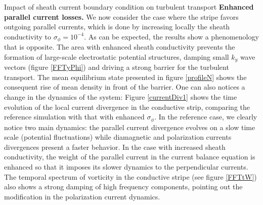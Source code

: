 \documentclass[a4paper,12pt]{article} %
\begin{document}
\begin{section}{Impact of sheath current boundary condition on turbulent transport}
\textbf{Enhanced parallel current losses.} We now consider the case where the stripe favors outgoing parallel 
currents, which is done by increasing locally the sheath conductivity to $\sigma_\phi=10^{-4}$. As can be expected, 
the results show a phenomenology that is opposite.
The area with enhanced sheath conductivity prevents the formation of large-scale electrostatic potential 
structures, damping small $k_y$ wave vectors (figure \ref{FFTyPhi}) and driving a strong barrier for the turbulent 
transport. The mean equilibrium state presented in figure \ref{profileN} shows the consequent rise of mean density 
in front of the barrier. 
One can also notices a change in the dynamics of the system: Figure \ref{currentDiv1}
shows the time evolution of the local current divergence in the conductive strip, comparing the reference simulation 
with that with enhanced $\sigma_\phi$. In the reference case, 
we clearly notice two main dynamics: the parallel current divergence evolves on a slow time scale (potential fluctuations)
while diamagnetic and polarization currents divergences present a faster behavior. 
In the case with increased sheath conductivity, the weight of the parallel current in the current balance equation 
is enhanced so that it imposes its slower dynamics to the perpendicular currents. 
The temporal spectrum of vorticity in the conductive stripe (see figure \ref{FFTtW}) 
also shows a strong damping of high frequency components, pointing out the modification in the polarization current 
dynamics.
\end{section}
\end{document}

